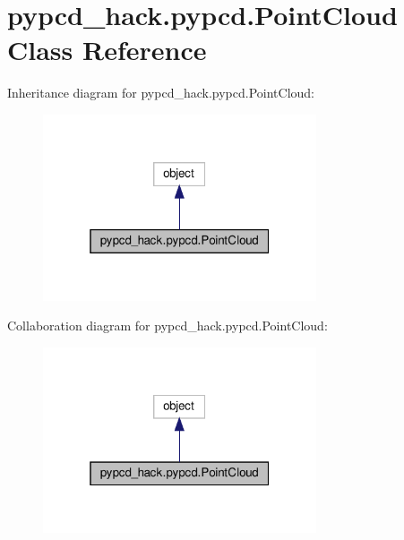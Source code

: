 \hypertarget{classpypcd__hack_1_1pypcd_1_1PointCloud}{}\section{pypcd\+\_\+hack.\+pypcd.\+Point\+Cloud Class Reference}
\label{classpypcd__hack_1_1pypcd_1_1PointCloud}


Inheritance diagram for pypcd\+\_\+hack.\+pypcd.\+Point\+Cloud\+:
\nopagebreak
\begin{figure}[H]
\begin{center}
\leavevmode
\includegraphics[width=229pt]{classpypcd__hack_1_1pypcd_1_1PointCloud__inherit__graph}
\end{center}
\end{figure}


Collaboration diagram for pypcd\+\_\+hack.\+pypcd.\+Point\+Cloud\+:
\nopagebreak
\begin{figure}[H]
\begin{center}
\leavevmode
\includegraphics[width=229pt]{classpypcd__hack_1_1pypcd_1_1PointCloud__coll__graph}
\end{center}
\end{figure}
